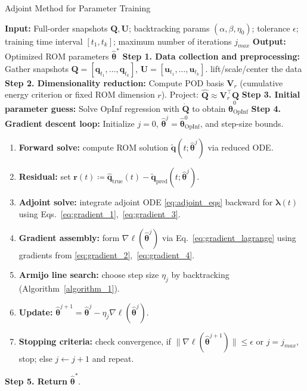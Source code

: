 \begin{center}
\begin{minipage}{0.95\textwidth}
\begin{algorithm}[H]
\caption{Adjoint Method for Parameter Training}\label{algorithm_2}
\SetAlgoNoLine
\textbf{Input:} Full-order snapshots $\mathbf{Q},\mathbf{U}$; backtracking params $(\alpha,\beta,\eta_0)$; tolerance $\epsilon$; training time interval $[t_1, t_k]$; maximum number of iterations $j_{max}$\;
\textbf{Output:} Optimized ROM parameters $\hat{\bm\theta}^*$\;
\vspace{0.3cm}
\textbf{Step 1. Data collection and preprocessing:} Gather snapshots $\mathbf{Q}=[\mathbf{q}_{t_1},\dots,\mathbf{q}_{t_k}]$, $\mathbf{U}=[\mathbf{u}_{t_1},\dots,\mathbf{u}_{t_k}]$.
\quad [Optional] lift/scale/center the data\;
\textbf{Step 2. Dimensionality reduction:} Compute POD basis $\mathbf{V}_r$ (cumulative energy criterion or fixed ROM dimension $r$). Project: $\hat{\mathbf{Q}} \approx \mathbf{V}_r^\top\mathbf{Q}$\;
\textbf{Step 3. Initial parameter guess:} Solve OpInf regression with $\dot{\mathbf{Q}}$ to obtain $\hat{\bm\theta}^{0}_{\text{OpInf}}$\;
\textbf{Step 4. Gradient descent loop:}
Initialize $j=0$, $\hat{\bm\theta}^j=\hat{\bm\theta}^{0}_{\text{OpInf}}$, and step-size bounds.
\begin{enumerate}[label=\arabic*.]
  \item \textbf{Forward solve:}
    compute ROM solution $\tilde{\mathbf{q}}(t;\hat{\bm\theta}^j)$ via reduced ODE.
  \item \textbf{Residual:}
    set $\mathbf{r}(t)\coloneqq\hat{\mathbf{q}}_{\text{true}}(t)-\tilde{\mathbf{q}}_{\text{pred}}(t;\hat{\bm\theta}^j)$.
  \item \textbf{Adjoint solve:}
    integrate adjoint ODE \eqref{eq:adjoint_eqs} backward for $\bm\lambda(t)$ using Eqs.~\eqref{eq:gradient_1},~\eqref{eq:gradient_3}.
  \item \textbf{Gradient assembly:}
    form $\nabla\ell(\hat{\bm\theta}^j)$ via Eq.~\eqref{eq:gradient_lagrange} using gradients from \eqref{eq:gradient_2},~\eqref{eq:gradient_4}.
  \item \textbf{Armijo line search:}
    choose step size \(\eta_j\) by backtracking (Algorithm~\ref{algorithm_1}).
  \item \textbf{Update:}
    $\hat{\bm\theta}^{j+1}=\hat{\bm\theta}^j-\eta_j\nabla\ell(\hat{\bm\theta}^j)$.
  \item \textbf{Stopping criteria:}
    check convergence, if $\|\nabla\ell(\hat{\bm\theta}^{j+1})\|\le\epsilon$ or $j=j_{max}$, stop; else $j\leftarrow j+1$ and repeat.
\end{enumerate}
\textbf{Step 5. Return} {$\hat{\bm\theta}^*$}.
\end{algorithm}
\end{minipage}
\end{center}
    

